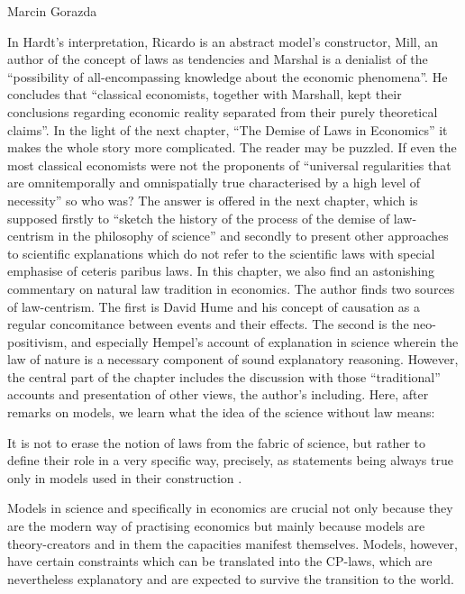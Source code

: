\begin{recengenv}{Marcin Gorazda}
\enlargethispage{-.5\baselineskip}

In Hardt’s interpretation, Ricardo is an abstract model’s constructor, Mill, an author of the concept of laws as
tendencies and Marshal is a denialist of the ``possibility of all-encompassing knowledge about the economic phenomena''.
He concludes that ``classical economists, together with Marshall, kept their conclusions regarding economic reality
separated from their purely theoretical claims''. In the light of the next chapter, ``The Demise of Laws in Economics'' it
makes the whole story more complicated. The reader may be puzzled. If even the most classical economists were not the
proponents of ``universal regularities that are omnitemporally and omnispatially true characterised by a high level of
necessity'' so who was? The answer is offered in the next chapter, which is supposed firstly to ``sketch the history of
the process of the demise of law-centrism in the philosophy of science'' and secondly to present other approaches to
scientific explanations which do not refer to the scientific laws with special emphasise of ceteris paribus laws. In
this chapter, we also find an astonishing commentary on natural law tradition in economics. The author finds two
sources of law-centrism. The first is David Hume and his concept of causation as a regular concomitance between events
and their effects. The second is the neo-positivism, and especially Hempel’s account of explanation in science wherein
the law of nature is a necessary component of sound explanatory reasoning. However, the central part of the chapter
includes the discussion with those ``traditional'' accounts and presentation of other views, the author’s including.
Here, after remarks on models, we learn what the idea of the science without law means:

\begin{myquoterev}
It is not to erase the notion of laws from the fabric of science, but rather to define their role in a very specific
way, precisely, as statements being always true only in models used in their construction
\parencite[p.78]{hardt_economics_2017}.
\end{myquoterev}

Models in science and specifically in economics are crucial not only because they are the modern way of practising
economics but mainly because models are theory-creators and in them the capacities manifest themselves. Models,
however, have certain constraints which can be translated into the CP-laws, which are nevertheless explanatory and are
expected to survive the transition to the world. 


\end{recengenv}
